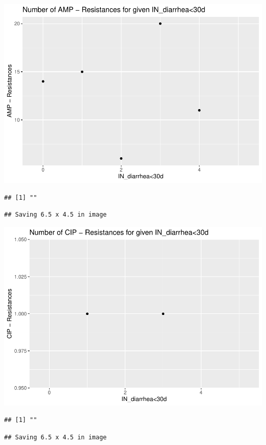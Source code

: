 \documentclass[
]{article}
\begin{document}
\includegraphics{NResistenzen_files/figure-latex/numerical_variables-31.pdf}

\begin{verbatim}
## [1] ""
\end{verbatim}

\begin{verbatim}
## Saving 6.5 x 4.5 in image
\end{verbatim}

\includegraphics{NResistenzen_files/figure-latex/numerical_variables-32.pdf}

\begin{verbatim}
## [1] ""
\end{verbatim}

\begin{verbatim}
## Saving 6.5 x 4.5 in image
\end{verbatim}
\end{document}

